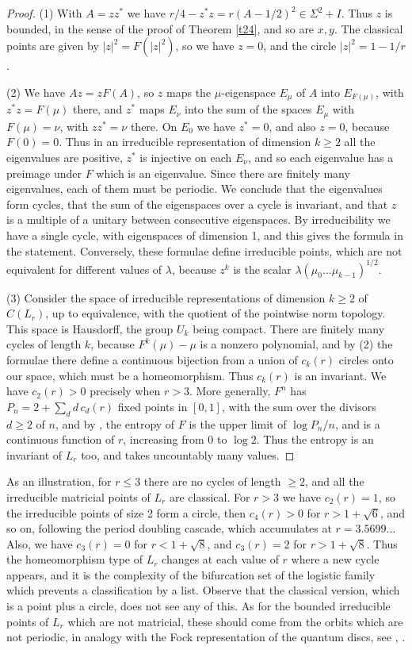 \documentclass[11pt]{amsart}
\theoremstyle{definition}
\begin{document}
\begin{proof}
(1) With $A=zz^*$ we have $r/4-z^*z=r(A-1/2)^2\in\Sigma^2+I$. Thus $z$ is bounded, in the sense of the proof of Theorem \ref{t24}, and so are $x,y$. The classical points are given by $|z|^2=F(|z|^2)$, so we have $z=0$, and the circle $|z|^2=1-1/r$.

(2) We have $Az=zF(A)$, so $z$ maps the $\mu$-eigenspace $E_\mu$ of $A$ into $E_{F(\mu)}$, with $z^*z=F(\mu)$ there, and $z^*$ maps $E_\nu$ into the sum of the spaces $E_\mu$ with $F(\mu)=\nu$, with $zz^*=\nu$ there. On $E_0$ we have $z^*=0$, and also $z=0$, because $F(0)=0$. Thus in an irreducible representation of dimension $k\geq2$ all the eigenvalues are positive, $z^*$ is injective on each $E_\nu$, and so each eigenvalue has a preimage under $F$ which is an eigenvalue. Since there are finitely many eigenvalues, each of them must be periodic. We conclude that the eigenvalues form cycles, that the sum of the eigenspaces over a cycle is invariant, and that $z$ is a multiple of a unitary between consecutive eigenspaces. By irreducibility we have a single cycle, with eigenspaces of dimension 1, and this gives the formula in the statement. Conversely, these formulae define irreducible points, which are not equivalent for different values of $\lambda$, because $z^k$ is the scalar $\lambda(\mu_0\ldots\mu_{k-1})^{1/2}$.

(3) Consider the space of irreducible representations of dimension $k\geq2$ of $C(L_r)$, up to equivalence, with the quotient of the pointwise norm topology. This space is Hausdorff, the group $U_k$ being compact. There are finitely many cycles of length $k$, because $F^k(\mu)-\mu$ is a nonzero polynomial, and by (2) the formulae there define a continuous bijection from a union of $c_k(r)$ circles onto our space, which must be a homeomorphism. Thus $c_k(r)$ is an invariant. We have $c_2(r)>0$ precisely when $r>3$. More generally, $F^n$ has $P_n=2+\sum_dd\,c_d(r)$ fixed points in $[0,1]$, with the sum over the divisors $d\geq2$ of $n$, and by \cite{mth}, \cite{msz} the entropy of $F$ is the upper limit of $\log P_n/n$, and is a continuous function of $r$, increasing from 0 to $\log2$. Thus the entropy is an invariant of $L_r$ too, and takes uncountably many values.
\end{proof}

As an illustration, for $r\leq3$ there are no cycles of length $\geq2$, and all the irreducible matricial points of $L_r$ are classical. For $r>3$ we have $c_2(r)=1$, so the irreducible points of size 2 form a circle, then $c_4(r)>0$ for $r>1+\sqrt6$, and so on, following the period doubling cascade, which accumulates at $r=3.5699\ldots$ Also, we have $c_3(r)=0$ for $r<1+\sqrt8$, and $c_3(r)=2$ for $r>1+\sqrt8$. Thus the homeomorphism type of $L_r$ changes at each value of $r$ where a new cycle appears, and it is the complexity of the bifurcation set of the logistic family which prevents a classification by a list. Observe that the classical version, which is a point plus a circle, does not see any of this. As for the bounded irreducible points of $L_r$ which are not matricial, these should come from the orbits which are not periodic, in analogy with the Fock representation of the quantum discs, see \cite{os1}, \cite{os2}.
\end{document}
